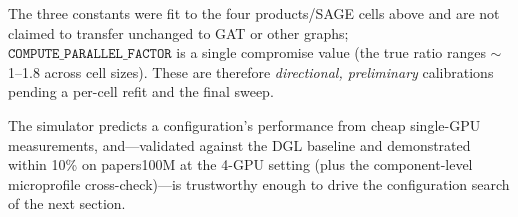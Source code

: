 The three constants were fit to the four products/SAGE cells above and are not claimed to
transfer unchanged to GAT or other graphs; $\texttt{COMPUTE\_PARALLEL\_FACTOR}$ is a single
compromise value (the true ratio ranges $\sim$1--1.8 across cell sizes). These are therefore
\emph{directional, preliminary} calibrations pending a per-cell refit and the final sweep.

The simulator predicts a configuration's performance from cheap single-GPU measurements,
and---validated against the DGL baseline and demonstrated within 10\% on papers100M at the
4-GPU setting (plus the component-level microprofile cross-check)---is trustworthy enough
to drive the configuration search of the next section.
